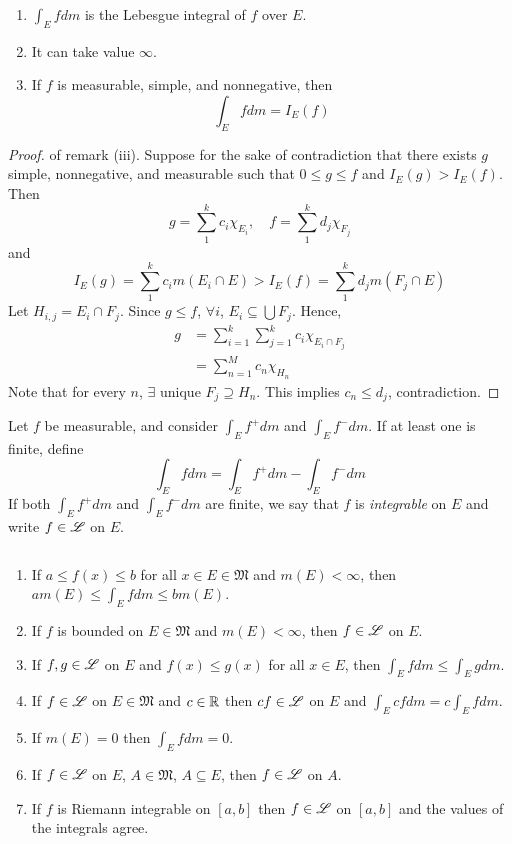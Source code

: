 \documentclass[11pt]{article}
\begin{document}
  \begin{remark} $\text{}$
    \begin{enumerate}
    \item $\int_E f dm$ is the Lebesgue integral of $f$ over $E$.
    \item It can take value $\infty$.
    \item If $f$ is measurable, simple, and nonnegative, then $$\int_E f dm = I_{E}(f)$$
   \end{enumerate}
 \end{remark}

  \begin{proof} of remark (iii).
        Suppose for the sake of contradiction that there exists $g$ simple, nonnegative, and measurable such that $0 \le g \le f$ and $I_E(g) > I_E(f)$. Then $$g = \sum_1^{k} c_i \chi_{E_{i}}, \quad f = \sum_1^k d_j \chi_{F_j}$$ and $$I_E(g) = \sum_1^k c_i m(E_i \cap E) > I_E(f) = \sum_1^k d_j m(F_j \cap E)$$ Let $H_{i, j} = E_i \cap F_j$. Since $g \le f$, $\forall i$, $E_i \subseteq \bigcup F_j$. Hence, \begin{align*} g & = \sum_{i = 1}^k \sum_{j = 1}^k c_i \chi_{E_i \cap F_j} \\ & = \sum_{n = 1}^M c_n \chi_{H_n} \end{align*} Note that for every $n$, $\exists$ unique $F_j \supseteq H_n$. This implies $c_n\le d_j$, contradiction.
      \end{proof}

  \begin{definition}
    Let $f$ be measurable, and consider $\int_E f^+ dm$ and $\int_E f^- dm$. If at least one is finite, define $$\int_E f dm = \int_E f^+ dm - \int_E f^- dm$$ If both $\int_E f^+ dm$ and $\int_E f^- dm$ are finite, we say that $f$ is \emph{integrable} on $E$ and write $f \in \mathscr{L}$ on $E$.
  \end{definition}

  \begin{remark} $\text{}$
    \begin{enumerate}
    \item If $a \le f(x) \le b$ for all $x \in E \in \mathfrak{M}$ and $m(E) < \infty$, then $am(E) \le \int_E f dm \le bm(E)$.
    \item If $f$ is bounded on $E \in \mathfrak{M}$ and $m(E) < \infty$, then $f \in \mathscr{L}$ on $E$.
    \item If $f, g \in \mathscr{L}$ on $E$ and $f(x) \le g(x)$ for all $x \in E$, then $\int_E f dm \le \int_E g dm$.
    \item If $f \in \mathscr{L}$ on $E \in \mathfrak{M}$ and $c \in \mathbb{R}$ then $cf \in \mathscr{L}$ on $E$ and $\int_E cf dm = c \int_E f dm$.
    \item If $m(E) = 0$ then $\int_E f dm = 0$.
    \item If $f \in \mathscr{L}$ on $E$, $A \in \mathfrak{M}$, $A \subseteq E$, then $f \in \mathscr{L}$ on $A$.
      \item If $f$ is Riemann integrable on $[a, b]$ then $f \in \mathscr{L}$ on $[a, b]$ and the values of the integrals agree.
    \end{enumerate}
  \end{remark}
\end{document}

